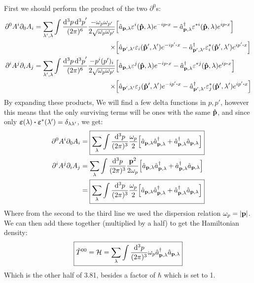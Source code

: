 \documentclass[12pt]{article}
\newcommand{\D}{\partial}
\newcommand{\veps}{\varepsilon}
\begin{document}
First we should perform the product of the two $\D^0$s:
\begin{align*}
  \D^0A^i\D_0A_i=\sum_{\lambda',\lambda}\int\frac{\dd[3]{p}\dd[3]{p}'}{(2\pi)^6}
  \frac{-\omega_p\omega_{p'}}{2\sqrt{\omega_p\omega_{p'}}}
  &\qty[\hat{a}_{\vb{p},\lambda}\veps^i(\vu{p},\lambda)e^{-ip\vdot x}-
  \hat{a}^\dag_{\vb{p},\lambda}\veps^{*i}(\vu{p},\lambda)e^{ip\vdot x}]\\
  \times&\qty[\hat{a}_{\vb{p'},\lambda'}\veps_i(\vu{p}',\lambda')e^{-ip'\vdot x}-
  \hat{a}^\dag_{\vb{p'},\lambda'}\veps^*_i(\vu{p}',\lambda')e^{ip'\vdot x}]\\
  \D^iA^j\D_iA_j=\sum_{\lambda',\lambda}\int\frac{\dd[3]{p}\dd[3]{p}'}{(2\pi)^6}
  \frac{-p^i(p')_i}{2\sqrt{\omega_p\omega_{p'}}}
  &\qty[\hat{a}_{\vb{p},\lambda}\veps^j(\vu{p},\lambda)e^{-ip\vdot x}-
  \hat{a}^\dag_{\vb{p},\lambda}\veps^{*j}(\vu{p},\lambda)e^{ip\vdot x}]\\
  \times&\qty[\hat{a}_{\vb{p'},\lambda'}\veps_j(\vu{p}',\lambda')e^{-ip'\vdot x}-
  \hat{a}^\dag_{\vb{p'},\lambda'}\veps^*_j(\vu{p}',\lambda')e^{ip'\vdot x}]
\end{align*}
By expanding these products, We will find a few delta functions in $p,p'$, however this means that the only surviving terms will be ones with the same $\vu{p}$, and since only $\bm\veps(\lambda)\vdot\bm\veps^*(\lambda')=\delta_{\lambda\lambda'}$, we get:
\begin{align*}
  \D^0A^i\D_0A_i&=\boxed{
  \sum_{\lambda}\int\frac{\dd[3]{p}}{(2\pi)^3}\frac{\omega_p}2
  \qty[\hat{a}_{\vb{p},\lambda}\hat{a}^\dag_{\vb{p},\lambda}+
  \hat{a}^\dag_{\vb{p},\lambda}\hat{a}_{\vb{p},\lambda}]}\\
  \D^iA^j\D_iA_j&=\sum_{\lambda}\int\frac{\dd[3]{p}}{(2\pi)^3}
  \frac{\vb{p}^2}{2\omega_p}
  \qty[\hat{a}_{\vb{p},\lambda}\hat{a}^\dag_{\vb{p},\lambda}+
  \hat{a}^\dag_{\vb{p},\lambda}\hat{a}_{\vb{p},\lambda}]\\
  &=\boxed{\sum_{\lambda}\int\frac{\dd[3]{p}}{(2\pi)^3}\frac{\omega_p}{2}
  \qty[\hat{a}_{\vb{p},\lambda}\hat{a}^\dag_{\vb{p},\lambda}+
  \hat{a}^\dag_{\vb{p},\lambda}\hat{a}_{\vb{p},\lambda}]}
\end{align*}
Where from the second to the third line we used the dispersion relation $\omega_p=\abs{\vb{p}}$. We can then add these together (multiplied by a half) to get the Hamiltonian density:
\begin{align}
  \boxed{\tilde{T}^{00}=\mathcal{H}=
  \sum_{\lambda}\int\frac{\dd[3]{p}}{(2\pi)^3}\omega_p
  \hat{a}^\dag_{\vb{p},\lambda}\hat{a}_{\vb{p},\lambda}}
\end{align}
Which is the other half of 3.81, besides a factor of $\hbar$ which is set to 1.
\end{document}
